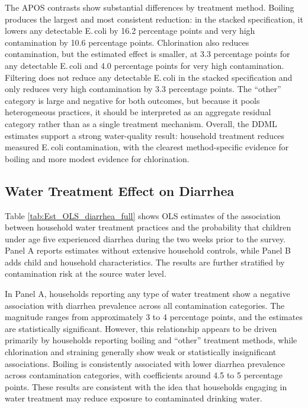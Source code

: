 \documentclass [11pt]{article}
\theoremstyle{plain}
\theoremstyle{definition}
\theoremstyle{remark}
\newcommand{\1}{\bm{1}}
\begin{document}
The APOS contrasts show substantial differences by treatment method. Boiling produces the largest and most consistent reduction: in the stacked specification, it lowers any detectable E.\,coli by 16.2 percentage points and very high contamination by 10.6 percentage points. Chlorination also reduces contamination, but the estimated effect is smaller, at 3.3 percentage points for any detectable E.\,coli and 4.0 percentage points for very high contamination. Filtering does not reduce any detectable E.\,coli in the stacked specification and only reduces very high contamination by 3.3 percentage points. The ``other'' category is large and negative for both outcomes, but because it pools heterogeneous practices, it should be interpreted as an aggregate residual category rather than as a single treatment mechanism. Overall, the DDML estimates support a strong water-quality result: household treatment reduces measured E.\,coli contamination, with the clearest method-specific evidence for boiling and more modest evidence for chlorination.

{\renewcommand\normalsize{\small}\normalsize\singlespacing
}

\clearpage
\subsection{Water Treatment Effect on Diarrhea}
Table \ref{tab:Est_OLS_diarrhea_full} shows OLS estimates of the association between household water treatment practices and the probability that children under age five experienced diarrhea during the two weeks prior to the survey. Panel A reports estimates without extensive household controls, while Panel B adds child and household characteristics. The results are further stratified by contamination risk at the source water level.

{\renewcommand\normalsize{\small}\normalsize\singlespacing  

}  

In Panel A, households reporting any type of water treatment show a negative association with diarrhea prevalence across all contamination categories. The magnitude ranges from approximately 3 to 4 percentage points, and the estimates are statistically significant. However, this relationship appears to be driven primarily by households reporting boiling and “other” treatment methods, while chlorination and straining generally show weak or statistically insignificant associations. Boiling is consistently associated with lower diarrhea prevalence across contamination categories, with coefficients around 4.5 to 5 percentage points. These results are consistent with the idea that households engaging in water treatment may reduce exposure to contaminated drinking water.
\end{document}
